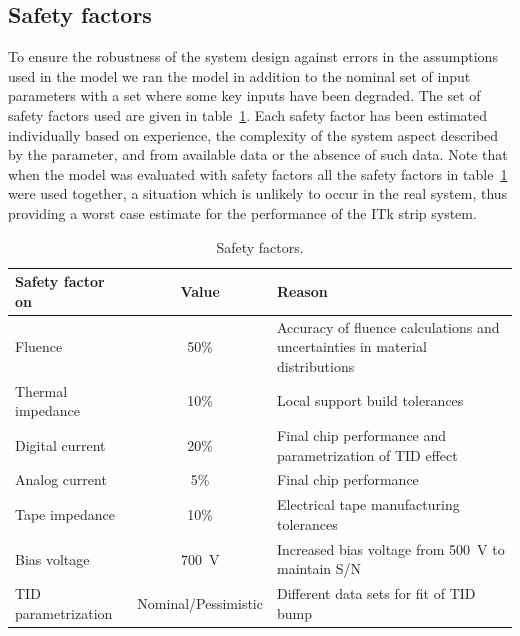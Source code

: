 \subsection{Safety factors}
To ensure the robustness of the system design against errors in the assumptions used in the model we ran the model in addition to the nominal set of input parameters with a set where some key inputs have been degraded. The set of safety factors used are given in table~\ref{tab:safetyfactors}. Each safety factor has been estimated individually based on experience, the complexity of the system aspect described by the parameter, and from available data or the absence of such data. Note that when the model was evaluated with safety factors all the safety factors in table~\ref{tab:safetyfactors} were used together, a situation which is unlikely to occur in the real system, thus providing a worst case estimate for the performance of the ITk strip system.

\begin{table}[htb]
\caption{Safety factors.}
\label{tab:safetyfactors}
\centering
\begin{tabular}{lcl}
Safety factor on & Value & Reason \\
\hline
Fluence  & 50\% & Accuracy of fluence calculations and uncertainties in material distributions\\
Thermal impedance & 10\% & Local support build tolerances\\
Digital current & 20\% & Final chip performance and parametrization of TID effect\\
Analog current & 5\% & Final chip performance\\
Tape impedance & 10\% & Electrical tape manufacturing tolerances\\
Bias voltage & 700~V & Increased bias voltage from 500~V to maintain S/N\\
TID parametrization & Nominal/Pessimistic & Different data sets for fit of TID bump\\
\end{tabular}
\end{table}

